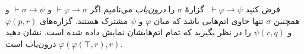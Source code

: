 فرض کنید
$\vdash\varphi\to\psi$.
گزارهٔ
$\sigma$
را
\emph{درون‌یاب}
می‌نامیم اگر
$\vdash\varphi\to\sigma$
و
$\vdash\sigma\to\psi$
و همچنین
$\sigma$
تنها حاوی اتم‌هایی باشد که میان
$\varphi$
و
$\psi$
مشترک هستند.
گزاره‌های
$\varphi(p,r)$
و
$\psi(r,q)$
را در نظر بگیرید که تمام اتم‌هایشان نمایش داده شده است. نشان دهید
$\varphi(\varphi(\top,r),r)$
درون‌یاب است.